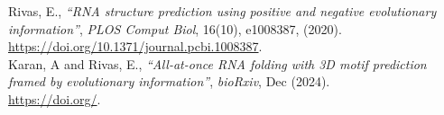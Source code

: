 \noindent
Rivas, E., \textit{``RNA structure prediction using
  positive and negative evolutionary information''},
\textit{PLOS Comput Biol}, 16(10), e1008387, (2020).\\
\url{https://doi.org/10.1371/journal.pcbi.1008387}.\\

\noindent
Karan, A and Rivas, E., \textit{``All-at-once RNA folding with 3D motif prediction framed by evolutionary information''},
\textit{bioRxiv}, Dec (2024).\\
\url{https://doi.org/}.\\






  









